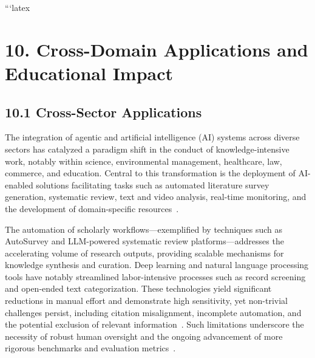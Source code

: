 \documentclass[11pt]{article}
\begin{document}
```latex
\section{10. Cross-Domain Applications and Educational Impact}

\subsection{10.1 Cross-Sector Applications}

The integration of agentic and artificial intelligence (AI) systems across diverse sectors has catalyzed a paradigm shift in the conduct of knowledge-intensive work, notably within science, environmental management, healthcare, law, commerce, and education. Central to this transformation is the deployment of AI-enabled solutions facilitating tasks such as automated literature survey generation, systematic review, text and video analysis, real-time monitoring, and the development of domain-specific resources~\cite{ref6,ref7,ref8,ref9,ref10,ref14,ref25,ref26,ref27,ref28,ref29,ref30,ref40,ref45,ref58,ref59,ref76,ref80,ref86,ref88,ref91,ref92,ref93,ref94,ref95,ref96,ref97,ref98,ref99,ref100,ref104,ref109,ref110,ref111,ref112,ref113,ref114,ref115}. 

The automation of scholarly workflows—exemplified by techniques such as AutoSurvey and LLM-powered systematic review platforms—addresses the accelerating volume of research outputs, providing scalable mechanisms for knowledge synthesis and curation. Deep learning and natural language processing tools have notably streamlined labor-intensive processes such as record screening and open-ended text categorization. These technologies yield significant reductions in manual effort and demonstrate high sensitivity, yet non-trivial challenges persist, including citation misalignment, incomplete automation, and the potential exclusion of relevant information~\cite{ref25,ref26,ref27,ref28,ref29,ref30,ref45,ref58,ref59,ref76,ref80,ref86,ref88,ref91,ref92,ref93,ref94,ref95,ref96,ref97,ref98,ref99,ref100,ref104}. Such limitations underscore the necessity of robust human oversight and the ongoing advancement of more rigorous benchmarks and evaluation metrics~\cite{ref29,ref30,ref45,ref99,ref100,ref104}.
\end{document}
